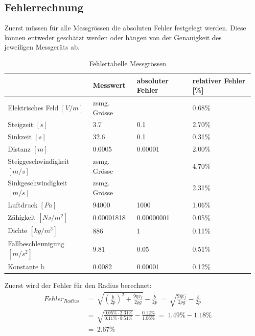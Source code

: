 \subsection{Fehlerrechnung}\label{sub:fehler}
Zuerst müssen für alle Messgrössen die absoluten Fehler festgelegt werden. Diese können entweder geschätzt werden oder hängen von der Genauigkeit des jeweiligen Messgeräts ab.

\begin{table}[h]
	\begin{center}
		\begin{tabular}{l|lll}
			                             & Messwert     & absoluter Fehler     & relativer Fehler [\%] \\ \toprule
			Elektrisches Feld $[V/m]$    & zsmg. Grösse &                      & 0.68\%                \\
			Steigzeit $[s]$              & 3.7          & 0.1                  & 2.70\%                \\
			Sinkzeit $[s]$               & 32.6         & 0.1                  & 0.31\%                \\
			Distanz $[m]$                & 0.0005       & 0.00001              & 2.00\%                \\
			Steiggeschwindigkeit $[m/s]$ & zsmg. Grösse &                      & 4.70\%                \\
			Sinkgeschwindigkeit $[m/s]$  & zsmg. Grösse &                      & 2.31\%                \\
			Luftdruck $[Pa]$             & 94000        & 1000                 & 1.06\%                \\
			Zähigkeit $[Ns/m^2]$         & 0.00001818   & 0.00000001           & 0.05\%                \\
			Dichte $[kg/m^3]$            & 886          & 1                    & 0.11\%                \\
			Fallbeschleunigung $[m/s^2]$ & 9.81         & 0.05 & 0.51\%                \\
			Konstante b                  & 0.0082       & 0.00001              & 0.12\%
		\end{tabular}
	\end{center}
	\caption{Fehlertabelle Messgrössen}
	\label{tab:messabsFehler}
\end{table}

\noindent Zuerst wird der Fehler für den Radius berechnet:
\begin{equation*}\label{eq:fehlerRadius}
	\begin{split}
		Fehler_{Radius} & \ = \ \sqrt{\left( \frac{b}{2p}\right)^2 + \frac{9\eta v_f}{2\rho g}} - \frac{b}{2p} \ = \ \sqrt{\frac{9\eta v_f}{2\rho g}} - \frac{b}{2p} \\
		                & \ = \ \sqrt{\frac{0.05\% \cdot 2.31\%}{0.11\% \cdot 0.51\%}} - \frac{0.12\%}{1.06\%} \ = \ 1.49\% - 1.18\%                                              \\
		                & \ = \ 2.67\%
	\end{split}
\end{equation*}

